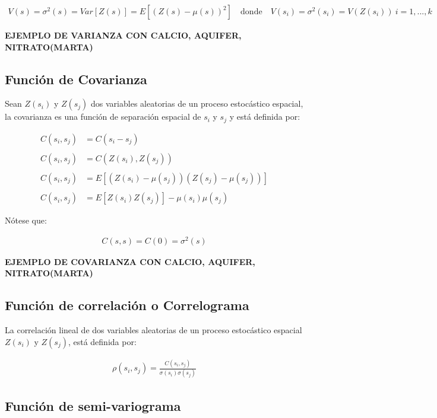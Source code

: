 \documentclass[
]{book}
\begin{document}
\begin{align}
  V(s)=\sigma^2(s)=Var[Z(s)]=E[(Z(s)-\mu(s))^2]\quad \text{donde} \quad V(s_i)=\sigma^2(s_i)=V(Z(s_i))\ i=1,...,k
\end{align}

\textbf{EJEMPLO DE VARIANZA CON CALCIO, AQUIFER, NITRATO(MARTA)}

\hypertarget{funciuxf3n-de-covarianza}{%
\subsection{Función de Covarianza}\label{funciuxf3n-de-covarianza}}

Sean \(Z(s_i)\) y \(Z(s_j)\) dos variables aleatorias de un proceso estocástico espacial, la covarianza es una función de separación espacial de \(s_i\) y \(s_j\) y está definida por:

\begin{align}
  C(s_i,s_j)&=C(s_i-s_j)\\ \\
  C(s_i,s_j)&=C(Z(s_i),Z(s_j))\\ \\
  C(s_i,s_j)&=E[(Z(s_i)-\mu(s_j))(Z(s_j)-\mu(s_j))]\\ \\
  C(s_i,s_j)&=E[Z(s_i)Z(s_j)]-\mu(s_i)\mu(s_j)
\end{align}

Nótese que:

\begin{align}
  C(s,s)=C(0)=\sigma^2(s)  
\end{align}

\textbf{EJEMPLO DE COVARIANZA CON CALCIO, AQUIFER, NITRATO(MARTA)}

\hypertarget{funciuxf3n-de-correlaciuxf3n-o-correlograma}{%
\subsection{Función de correlación o Correlograma}\label{funciuxf3n-de-correlaciuxf3n-o-correlograma}}

La correlación lineal de dos variables aleatorias de un proceso estocástico espacial \(Z(s_i)\) y \(Z(s_j)\), está definida por:

\begin{align}
  \rho(s_i,s_j)=\frac{C(s_i,s_j)}{\sigma(s_i)\sigma(s_j)}  
\end{align}

\hypertarget{funciuxf3n-de-semi-variograma}{%
\subsection{Función de semi-variograma}\label{funciuxf3n-de-semi-variograma}}
\end{document}
